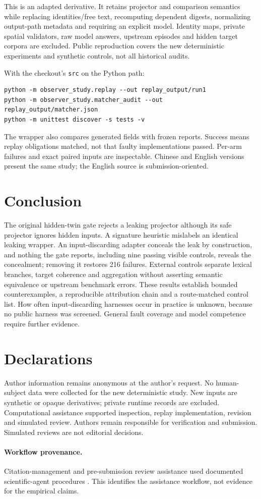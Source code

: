 \documentclass[11pt]{article}
\begin{document}
This is an adapted derivative. It retains projector and comparison semantics while replacing identities/free text, recomputing dependent digests, normalizing output-path metadata and requiring an explicit model. Identity maps, private spatial validators, raw model answers, upstream episodes and hidden target corpora are excluded. Public reproduction covers the new deterministic experiments and synthetic controls, not all historical audits.

With the checkout's \texttt{src} on the Python path:
\begin{lstlisting}
python -m observer_study.replay --out replay_output/run1
python -m observer_study.matcher_audit --out replay_output/matcher.json
python -m unittest discover -s tests -v
\end{lstlisting}
The wrapper also compares generated fields with frozen reports. Success means replay obligations matched, not that faulty implementations passed. Per-arm failures and exact paired inputs are inspectable. Chinese and English versions present the same study; the English source is submission-oriented.

\section{Conclusion}
The original hidden-twin gate rejects a leaking projector although its safe projector ignores hidden inputs. A signature heuristic mislabels an identical leaking wrapper. An input-discarding adapter conceals the leak by construction, and nothing the gate reports, including nine passing visible controls, reveals the concealment; removing it restores 216 failures. External controls separate lexical branches, target coherence and aggregation without asserting semantic equivalence or upstream benchmark errors. These results establish bounded counterexamples, a reproducible attribution chain and a route-matched control list. How often input-discarding harnesses occur in practice is unknown, because no public harness was screened. General fault coverage and model competence require further evidence.

\section*{Declarations}
Author information remains anonymous at the author's request. No human-subject data were collected for the new deterministic study. New inputs are synthetic or opaque derivatives; private runtime records are excluded. Computational assistance supported inspection, replay implementation, revision and simulated review. Authors remain responsible for verification and submission. Simulated reviews are not editorial decisions.
\paragraph{Workflow provenance.} Citation-management and pre-submission review assistance used documented scientific-agent procedures \cite{skills}. This identifies the assistance workflow, not evidence for the empirical claims.
\clearpage
\small


\end{document}
